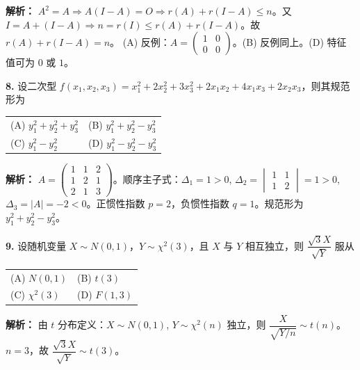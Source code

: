 \ifshowsolutions\par\noindent\textbf{解析：} $A^2=A \Rightarrow A(I-A)=O \Rightarrow r(A)+r(I-A)\leqslant n$。又 $I=A+(I-A) \Rightarrow n=r(I)\leqslant r(A)+r(I-A)$。故 $r(A)+r(I-A)=n$。
(A) 反例：$A=\begin{pmatrix}1&0\\0&0\end{pmatrix}$。(B) 反例同上。(D) 特征值可为 $0$ 或 $1$。\else \answerarea \fi

\vspace{8pt}

\textbf{8.} 设二次型 $f(x_1,x_2,x_3) = x_1^2 + 2x_2^2 + 3x_3^2 + 2x_1x_2 + 4x_1x_3 + 2x_2x_3$，则其规范形为
\begin{center}
\begin{tabular}{ll}
(A) $y_1^2 + y_2^2 + y_3^2$ & (B) $y_1^2 + y_2^2 - y_3^2$ \\[6pt]
(C) $y_1^2 - y_2^2$ & (D) $y_1^2 - y_2^2 - y_3^2$
\end{tabular}
\end{center}

\ifshowsolutions\par\noindent\textbf{解析：} $A = \begin{pmatrix} 1 & 1 & 2 \\ 1 & 2 & 1 \\ 2 & 1 & 3 \end{pmatrix}$。顺序主子式：$\Delta_1=1>0$, $\Delta_2=\begin{vmatrix}1&1\\1&2\end{vmatrix}=1>0$, $\Delta_3=|A|=-2<0$。正惯性指数 $p=2$，负惯性指数 $q=1$。规范形为 $y_1^2+y_2^2-y_3^2$。\else \answerarea \fi

\vspace{8pt}

\textbf{9.} 设随机变量 $X \sim N(0,1)$，$Y \sim \chi^2(3)$，且 $X$ 与 $Y$ 相互独立，则 $\dfrac{\sqrt{3}X}{\sqrt{Y}}$ 服从
\begin{center}
\begin{tabular}{ll}
(A) $N(0,1)$ & (B) $t(3)$ \\[6pt]
(C) $\chi^2(3)$ & (D) $F(1,3)$
\end{tabular}
\end{center}

\ifshowsolutions\par\noindent\textbf{解析：} 由 $t$ 分布定义：$X\sim N(0,1)$, $Y\sim\chi^2(n)$ 独立，则 $\dfrac{X}{\sqrt{Y/n}}\sim t(n)$。$n=3$，故 $\dfrac{\sqrt{3}X}{\sqrt{Y}}\sim t(3)$。\else \answerarea \fi

